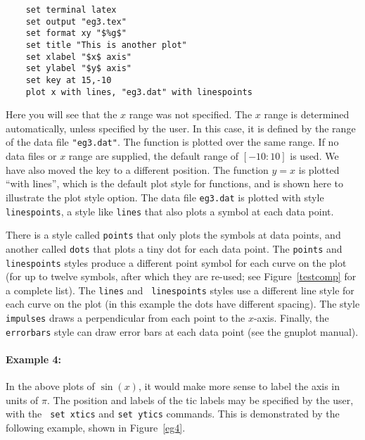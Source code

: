 \singlespace
\begin{verbatim}
    set terminal latex
    set output "eg3.tex"
    set format xy "$%g$"
    set title "This is another plot"
    set xlabel "$x$ axis"
    set ylabel "$y$ axis"
    set key at 15,-10
    plot x with lines, "eg3.dat" with linespoints
\end{verbatim}
\currentspace


Here you will see that the $x$ range was not specified. The $x$ range
is determined automatically, unless specified by the user.  In
this case, it is defined by the range of the data file
\verb+"eg3.dat"+. The function is plotted over the same range. If no
data files or $x$ range are supplied, the default range of $[-10:10]$
is used. We have also moved the key to a different position.  The
function $y=x$ is plotted ``with lines'', which is the default plot
style for functions, and is shown here to illustrate the plot style
option.  The data file {\tt eg3.dat} is plotted with style {\tt
linespoints}, a style like {\tt lines} that also plots a symbol at
each data point.

There is a style called {\tt points} that only plots the symbols at
data points, and another called {\tt dots} that plots a tiny dot for
each data point.  The {\tt points} and {\tt linespoints} styles
produce a different point symbol for each curve on the plot (for up to
twelve symbols, after which they are re-used; see
Figure~\ref{testcomp} for a complete list). The {\tt lines} and {\tt
linespoints} styles use a different line style for each curve on the
plot (in this example the dots have different spacing). The
style {\tt impulses} draws a perpendicular from each point to the
$x$-axis. Finally, the {\tt errorbars} style can draw error bars at
each data point (see the gnuplot manual).

\paragraph{Example 4:} In the above plots of $\sin(x)$, it would make
more sense to label the axis in units of $\pi$. The position and
labels of the tic labels may be specified by the user, with the {\tt
set xtics} and {\tt set ytics} commands. This is demonstrated by
the following example, shown in Figure~\ref{eg4}.

